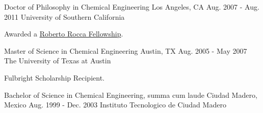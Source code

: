 

\begin{cventries}

  \cventry
    {Doctor of Philosophy in Chemical Engineering} %
    {Los Angeles, CA} %
    {Aug. 2007 - Aug. 2011} %
    {University of Southern California} %
    {
      \begin{cvitems} %
        \item  Awarded a {\href{http://www.robertorocca.org/en/fellowships/fellows07.aspx}{Roberto Rocca Fellowship}}.
      \end{cvitems}
    }%
  \cventry
      {Master of Science in Chemical Engineering} %
      {Austin, TX} %
      {Aug. 2005 - May 2007} %
      {The University of Texas at Austin} %
      {
        \begin{cvitems} %
          \item Fulbright Scholarship Recipient.
        \end{cvitems}
      }%
  \cventry
      {Bachelor of Science in Chemical Engineering, summa cum laude} %
      {Ciudad Madero, Mexico} %
      {Aug. 1999 - Dec. 2003} %
      {Instituto Tecnologico de Ciudad Madero} %
      {}
\end{cventries}
